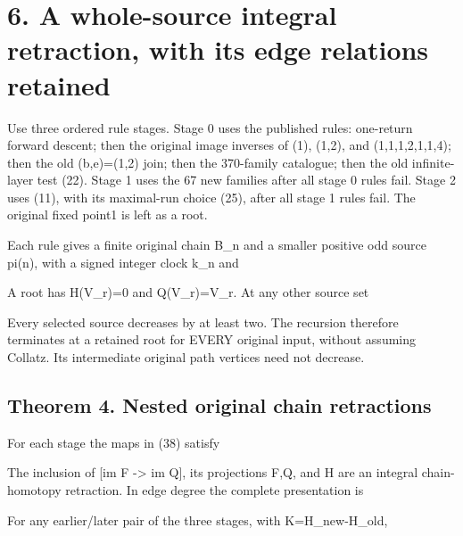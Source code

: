 \section{6. A whole-source integral retraction, with its edge relations
retained}

Use three ordered rule stages. Stage 0 uses the published rules:
one-return forward descent; then the original image inverses of (1),
(1,2), and (1,1,1,2,1,1,4); then the old (b,e)=(1,2) join; then the
370-family catalogue; then the old infinite-layer test (22). Stage 1
uses the 67 new families after all stage 0 rules fail. Stage 2 uses
(11), with its maximal-run choice (25), after all stage 1 rules fail.
The original fixed point1 is left as a root.

Each rule gives a finite original chain B\_n and a smaller positive odd
source pi(n), with a signed integer clock k\_n and


A root has H(V\_r)=0 and Q(V\_r)=V\_r. At any other source set


Every selected source decreases by at least two. The recursion therefore
terminates at a retained root for EVERY original input, without assuming
Collatz. Its intermediate original path vertices need not decrease.

\subsection{Theorem 4. Nested original chain retractions}

For each stage the maps in (38) satisfy


The inclusion of {[}im F -\textgreater{} im Q{]}, its projections F,Q,
and H are an integral chain-homotopy retraction. In edge degree the
complete presentation is


For any earlier/later pair of the three stages, with K=H\_new-H\_old,


